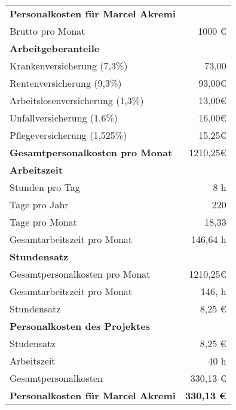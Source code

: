 \begin{tabularx}{\textwidth}{Xr}
    \rowcolor{heading}\textbf{Personalkosten für Marcel Akremi} & \textbf{} \\
    Brutto pro Monat & 1000 € \\
    \rowcolor{odd}\textbf{Arbeitgeberanteile} & \textbf{} \\
    Krankenversicherung (7,3\%) & 73,00 \\
    \rowcolor{odd}Rentenversicherung (9,3\%) & 93,00€ \\
    Arbeitslosenversicherung (1,3\%) & 13,00€ \\
    \rowcolor{odd}Unfallversicherung (1,6\%) & 16,00€ \\
    Pflegeversicherung (1,525\%) & 15,25€ \\
    \rowcolor{odd}\textbf{Gesamtpersonalkosten pro Monat} & 1210,25€ \\
    \textbf{Arbeitszeit} & \textbf{} \\
    \rowcolor{odd}Stunden pro Tag & 8 h \\
    Tage pro Jahr & 220 \\
    \rowcolor{odd}Tage pro Monat & 18,33 \\
    Gesamtarbeitszeit pro Monat & 146,64 h \\
    \rowcolor{odd}\textbf{Stundensatz} & \textbf{} \\
    Gesamtpersonalkosten pro Monat & 1210,25€ \\
    \rowcolor{odd}Gesamtarbeitszeit pro Monat & 146, h \\
    Stundensatz & 8,25 € \\
    \rowcolor{odd}\textbf{Personalkosten des Projektes} & \textbf{} \\
    Studensatz & 8,25 € \\
    \rowcolor{odd}Arbeitszeit & 40 h \\
    Gesamtpersonalkosten & 330,13 € \\
    \hline
    \hline
    \rowcolor{heading}\textbf{Personalkosten für Marcel Akremi} & \textbf{330,13 €} \\
    \end{tabularx}